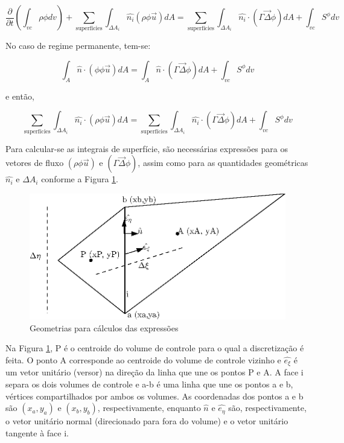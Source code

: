 \begin{equation}
    \label{eq:6.8}
    \frac{\partial}{\partial t}(\int_{vc}\rho \phi dv) + \sum_{\text{superfícies}} \int_{\Delta A_i} \hat{n_i} (\rho \phi \vec{u}) dA= \sum_{\text{superfícies}} \int_{\Delta A_i} \hat{n_i} \cdot (\Gamma \vec{\Delta} \phi) dA + \int_{vc} S^\phi dv
\end{equation}

No caso de regime permanente, tem-se:

\begin{equation}
    \label{eq:6.9}
    \int_A \hat{n} \cdot (\phi \phi \vec{u}) dA = \int_A \hat{n} \cdot (\Gamma \vec{\Delta} \phi) dA + \int_{vc} S^\phi dv
\end{equation}

e então,

\begin{equation}
    \label{eq:6.10}
    \sum_{\text{superfícies}} \int_{\Delta A_i} \hat{n_i} \cdot (\rho \phi \vec{u}) dA = \sum_{\text{superfícies}} \int_{\Delta A_i} \hat{n_i} \cdot (\Gamma \vec{\Delta} \phi) dA + \int_{vc} S^\phi dv
\end{equation}

Para calcular-se as integrais de superfície, são necessárias expressões para os vetores de fluxo $(\rho \phi \vec{u})$ e $(\Gamma \vec{\Delta} \phi)$, assim como para as quantidades geométricas $\hat{n_i}$ e $\Delta A_i$ conforme a Figura \ref{fig:geometrias}.

\begin{figure}[h]
    \centering
    \includegraphics{fig/geometrias.eps}
    \caption{Geometrias para cálculos das expressões}
    \label{fig:geometrias}
\end{figure}

Na Figura \ref{fig:geometrias}, P é o centroide do volume de controle para o qual a discretização é feita. O ponto A corresponde ao centroide do volume de controle vizinho e $\hat{e_\xi}$ é um vetor unitário (versor) na direção da linha que une os pontos P e A. A face i separa os dois volumes de controle e a-b é uma linha que une os pontos a e b, vértices compartilhados por ambos os volumes. As coordenadas dos pontos a e b são $(x_a, y_a)$ e $(x_b, y_b)$, respectivamente, enquanto $\hat{n}$ e $\hat{e_\eta}$ são, respectivamente, o vetor unitário normal (direcionado para fora do volume) e o vetor unitário tangente à face i.

